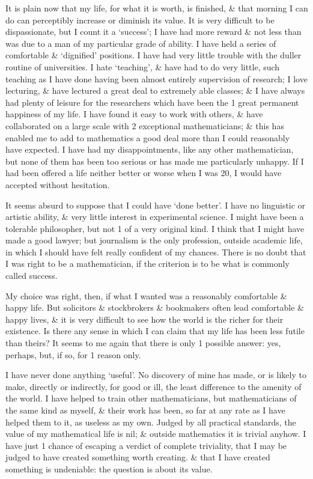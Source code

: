 \documentclass{article}
\numberwithin{equation}{section}
\begin{document}
It is plain now that my life, for what it is worth, is finished, \& that morning I can do can perceptibly increase or diminish its value. It is very difficult to be dispassionate, but I count it a `success'; I have had more reward \& not less than was due to a man of my particular grade of ability. I have held a series of comfortable \& `dignified' positions. I have had very little trouble with the duller routine of universities. I hate `teaching', \& have had to do very little, such teaching as I have done having been almost entirely supervision of research; I love lecturing, \& have lectured a great deal to extremely able classes; \& I have always had plenty of leisure for the researchers which have been the 1 great permanent happiness of my life. I have found it easy to work with others, \& have collaborated on a large scale with 2 exceptional mathematicians; \& this has enabled me to add to mathematics a good deal more than I could reasonably have expected. I have had my disappointments, like any other mathematician, but none of them has been too serious or has made me particularly unhappy. If I had been offered a life neither better or worse when I was 20, I would have accepted without hesitation.

It seems absurd to suppose that I could have `done better'. I have no linguistic or artistic ability, \& very little interest in experimental science. I might have been a tolerable philosopher, but not 1 of a very original kind. I think that I might have made a good lawyer; but journalism is the only profession, outside academic life, in which I should have felt really confident of my chances. There is no doubt that I was right to be a mathematician, if the criterion is to be what is commonly called success.

My choice was right, then, if what I wanted was a reasonably comfortable \& happy life. But solicitors \& stockbrokers \& bookmakers often lead comfortable \& happy lives, \& it is very difficult to see how the world is the richer for their existence. Is there any sense in which I can claim that my life has been less futile than theirs? It seems to me again that there is only 1 possible answer: yes, perhaps, but, if so, for 1 reason only.

I have never done anything `useful'. No discovery of mine has made, or is likely to make, directly or indirectly, for good or ill, the least difference to the amenity of the world. I have helped to train other mathematicians, but mathematicians of the same kind as myself, \& their work has been, so far at any rate as I have helped them to it, as useless as my own. Judged by all practical standards, the value of my mathematical life is nil; \& outside mathematics it is trivial anyhow. I have just 1 chance of escaping a verdict of complete triviality, that I may be judged to have created something worth creating. \& that I have created something is undeniable: the question is about its value.
\end{document}
